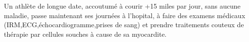 Un athlète de longue date, accoutumé à courir +15 miles par jour, sans aucune
maladie, passe maintenant ses journées à l'hopital, à faire des examens médicaux
(IRM,ECG,échocardiogramme,prises de sang) et prendre traitements couteux de
thérapie par cellules souches à cause de sa myocardite.

